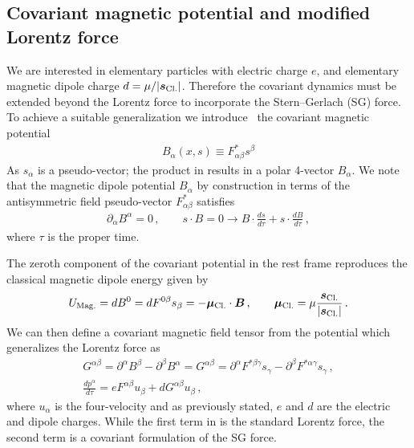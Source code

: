 \subsection{Covariant magnetic potential and modified Lorentz force}
\label{sec:magpotential}
We are interested in elementary particles with electric charge $e$, and elementary magnetic dipole charge $d=\mu/|\boldsymbol{s}_\mathrm{Cl.}|$. Therefore the covariant dynamics must be extended beyond the Lorentz force to incorporate the Stern–Gerlach (SG) force. To achieve a suitable generalization we introduce~\citep{Rafelski:2017hce} the covariant magnetic potential
\begin{gather}
    \label{bpot:1}
    B_{\alpha}(x,s)\equiv F_{\alpha\beta}^{*}s^{\beta}
\end{gather}
As $s_{\alpha}$ is a pseudo-vector; the product in  results in a polar 4-vector $B_{\alpha}$. We note that the magnetic dipole potential $B_{\alpha}$ by construction in terms of the antisymmetric field pseudo-vector $F_{\alpha\beta}^{*}$ satisfies
\begin{gather}
    \label{bpot:2}
    \partial_{\alpha}B^{\alpha}=0\,,\qquad s\cdot B=0 \rightarrow B\cdot\frac{ds}{d\tau}+s\cdot\frac{dB}{d\tau}\,,
\end{gather}
where $\tau$ is the proper time.

The zeroth component of the covariant potential in the rest frame  reproduces the classical magnetic dipole energy given by
\begin{gather}
    U_\mathrm{Mag.}=dB^{0}=dF^{0\beta}s_{\beta}=-\boldsymbol{\mu}_\mathrm{Cl.}\cdot\boldsymbol{B}\,,\qquad \boldsymbol{\mu}_\mathrm{Cl.}=\mu\frac{\boldsymbol{s}_\mathrm{Cl.}}{|\boldsymbol{s}_\mathrm{Cl.}|}\,.
\end{gather}
We can then define a covariant magnetic field tensor from the potential  which generalizes the Lorentz force as
\begin{gather}
    \label{LSG02}
    G^{\alpha\beta}=\partial^{\alpha}B^{\beta}-\partial^{\beta}B^{\alpha}= G^{\alpha\beta}=\partial^{\alpha}F^{*\beta\gamma}s_{\gamma}-\partial^{\beta}F^{*\alpha\gamma}s_{\gamma}\,,\\
    \label{LSG01}
    \frac{dp^{\alpha}}{d\tau}=eF^{\alpha\beta}u_{\beta}+dG^{\alpha\beta}u_{\beta}\,,
\end{gather}
where $u_{\alpha}$ is the four-velocity and as previously stated, $e$ and $d$ are the electric and dipole charges. While the first term in  is the standard Lorentz force, the second term is a covariant formulation of the SG force.

